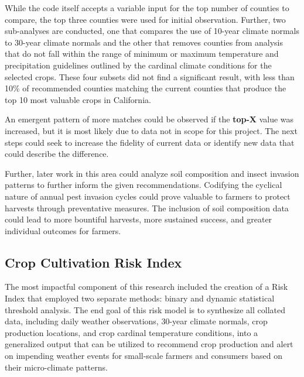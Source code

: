 \documentclass{article}
\begin{document}
While the code itself accepts a variable input for the top number of counties to compare, the top three counties were used for initial observation. Further, two sub-analyses are conducted, one that compares the use of 10-year climate normals to 30-year climate normals and the other that removes counties from analysis that do not fall within the range of minimum or maximum temperature and precipitation guidelines outlined by the cardinal climate conditions for the selected crops. These four subsets did not find a significant result, with less than 10\% of recommended counties matching the current counties that produce the top 10 most valuable crops in California. 

An emergent pattern of more matches could be observed if the \textbf{top-X} value was increased, but it is most likely due to data not in scope for this project. The next steps could seek to increase the fidelity of current data or identify new data that could describe the difference. 

Further, later work in this area could analyze soil composition and insect invasion patterns to further inform the given recommendations. Codifying the cyclical nature of annual pest invasion cycles could prove valuable to farmers to protect harvests through preventative measures. The inclusion of soil composition data could lead to more bountiful harvests, more sustained success, and greater individual outcomes for farmers. 

\subsection{Crop Cultivation Risk Index}
\label{sec:riskindex}
\hspace{.5cm}The most impactful component of this research included the creation of a Risk Index that employed two separate methods: binary and dynamic statistical threshold analysis. The end goal of this risk model is to synthesize all collated data, including daily weather observations, 30-year climate normals, crop production locations, and crop cardinal temperature conditions, into a generalized output that can be utilized to recommend crop production and alert on impending weather events for small-scale farmers and consumers based on their micro-climate patterns.
\end{document}
